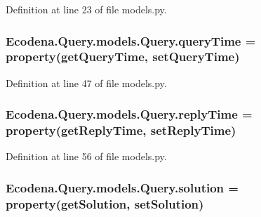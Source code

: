 Definition at line 23 of file models.py.

\hypertarget{class_ecodena_1_1_query_1_1models_1_1_query_a922030477827a717dbe6277292084874}{
\subsubsection[{queryTime}]{\setlength{\rightskip}{0pt plus 5cm}Ecodena.Query.models.Query.queryTime = property(getQueryTime, setQueryTime)}}
\label{de/d81/class_ecodena_1_1_query_1_1models_1_1_query_a922030477827a717dbe6277292084874}


Definition at line 47 of file models.py.

\hypertarget{class_ecodena_1_1_query_1_1models_1_1_query_a120b8bc5cef02ce8727153a0126cec3c}{
\subsubsection[{replyTime}]{\setlength{\rightskip}{0pt plus 5cm}Ecodena.Query.models.Query.replyTime = property(getReplyTime, setReplyTime)}}
\label{de/d81/class_ecodena_1_1_query_1_1models_1_1_query_a120b8bc5cef02ce8727153a0126cec3c}


Definition at line 56 of file models.py.

\hypertarget{class_ecodena_1_1_query_1_1models_1_1_query_a44c24c91765bafb665f0a4ff25819694}{
\subsubsection[{solution}]{\setlength{\rightskip}{0pt plus 5cm}Ecodena.Query.models.Query.solution = property(getSolution, setSolution)}}
\label{de/d81/class_ecodena_1_1_query_1_1models_1_1_query_a44c24c91765bafb665f0a4ff25819694}


